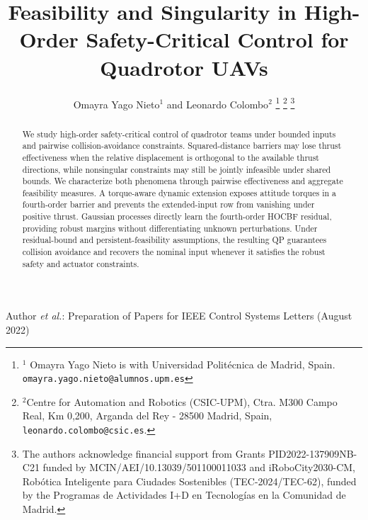 \documentclass[journal,twoside,web]{ieeecolor}
\begin{document}
\def\BibTeX{{\rm B\kern-.05em{\sc i\kern-.025em b}\kern-.08em
    T\kern-.1667em\lower.7ex\hbox{E}\kern-.125emX}}
{Author \MakeLowercase{\textit{et al.}}: Preparation of Papers for IEEE Control Systems Letters (August 2022)}


\title{Feasibility and Singularity in High-Order Safety-Critical Control for Quadrotor UAVs}


\author{Omayra Yago Nieto$^{1}$ and Leonardo Colombo$^{2}$
\thanks{$^1$ Omayra Yago Nieto is with Universidad Politécnica de Madrid, Spain. {\tt\small omayra.yago.nieto@alumnos.upm.es}}
\thanks{$^2$Centre for Automation and Robotics (CSIC-UPM), Ctra. M300 Campo Real, Km 0,200, Arganda del Rey - 28500 Madrid, Spain, {\tt\small leonardo.colombo@csic.es}.}
\thanks{The authors acknowledge financial support from Grants PID2022-137909NB-C21 funded by MCIN/AEI/10.13039/501100011033 and iRoboCity2030-CM, Robótica Inteligente para Ciudades Sostenibles (TEC-2024/TEC-62), funded by the Programas de Actividades I+D en Tecnologías en la Comunidad de Madrid.}}



\maketitle
\thispagestyle{empty}
 


\begin{abstract}
We study high-order safety-critical control of quadrotor teams
under bounded inputs and pairwise collision-avoidance constraints.
Squared-distance barriers may lose thrust effectiveness when the
relative displacement is orthogonal to the available thrust
directions, while nonsingular constraints may still be jointly
infeasible under shared bounds. We characterize both phenomena
through pairwise effectiveness and aggregate feasibility measures.
A torque-aware dynamic extension exposes attitude torques in a
fourth-order barrier and prevents the extended-input row from
vanishing under positive thrust. Gaussian processes directly learn
the fourth-order HOCBF residual, providing robust margins without
differentiating unknown perturbations. Under residual-bound and
persistent-feasibility assumptions, the resulting QP guarantees
collision avoidance and recovers the nominal input whenever it
satisfies the robust safety and actuator constraints.
\end{abstract}
\end{document}
